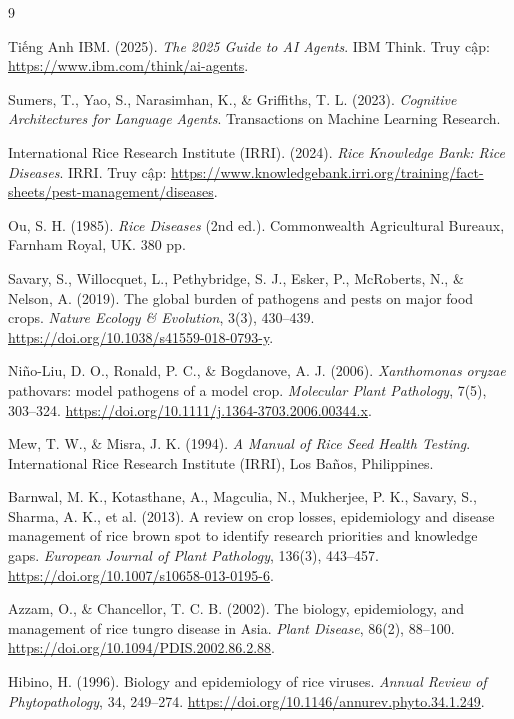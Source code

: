 \documentclass{uetgraduation}
\begin{document}
\begin{thebibliography}{9}
\begin{bibsection}{Tiếng Anh}
IBM. (2025). \textit{The 2025 Guide to AI Agents}. IBM Think. Truy cập: \url{https://www.ibm.com/think/ai-agents}.

Sumers, T., Yao, S., Narasimhan, K., \& Griffiths, T. L. (2023). \textit{Cognitive Architectures for Language Agents}. Transactions on Machine Learning Research.

International Rice Research Institute (IRRI). (2024). \textit{Rice Knowledge Bank: Rice Diseases}. IRRI. Truy cập: \url{https://www.knowledgebank.irri.org/training/fact-sheets/pest-management/diseases}.

Ou, S. H. (1985). \textit{Rice Diseases} (2nd ed.). Commonwealth Agricultural Bureaux, Farnham Royal, UK. 380 pp.

Savary, S., Willocquet, L., Pethybridge, S. J., Esker, P., McRoberts, N., \& Nelson, A. (2019). The global burden of pathogens and pests on major food crops. \textit{Nature Ecology \& Evolution}, 3(3), 430--439. \url{https://doi.org/10.1038/s41559-018-0793-y}.

Niño-Liu, D. O., Ronald, P. C., \& Bogdanove, A. J. (2006). \textit{Xanthomonas oryzae} pathovars: model pathogens of a model crop. \textit{Molecular Plant Pathology}, 7(5), 303--324. \url{https://doi.org/10.1111/j.1364-3703.2006.00344.x}.

Mew, T. W., \& Misra, J. K. (1994). \textit{A Manual of Rice Seed Health Testing}. International Rice Research Institute (IRRI), Los Baños, Philippines.

Barnwal, M. K., Kotasthane, A., Magculia, N., Mukherjee, P. K., Savary, S., Sharma, A. K., et al. (2013). A review on crop losses, epidemiology and disease management of rice brown spot to identify research priorities and knowledge gaps. \textit{European Journal of Plant Pathology}, 136(3), 443--457. \url{https://doi.org/10.1007/s10658-013-0195-6}.

Azzam, O., \& Chancellor, T. C. B. (2002). The biology, epidemiology, and management of rice tungro disease in Asia. \textit{Plant Disease}, 86(2), 88--100. \url{https://doi.org/10.1094/PDIS.2002.86.2.88}.

Hibino, H. (1996). Biology and epidemiology of rice viruses. \textit{Annual Review of Phytopathology}, 34, 249--274. \url{https://doi.org/10.1146/annurev.phyto.34.1.249}.



\end{bibsection}
\end{thebibliography}
\end{document}
